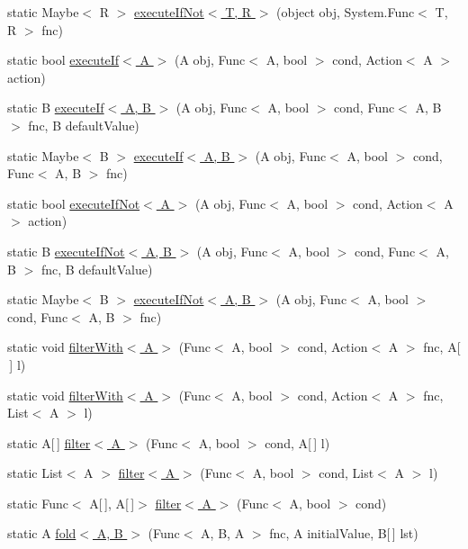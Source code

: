 \begin{DoxyCompactItemize}
\item 
static Maybe$<$ R $>$ \hyperlink{class_prelude_ace501339d5ef1cf13eb4746e6a0b27af}{execute\+If\+Not$<$ T, R $>$} (object obj, System.\+Func$<$ T, R $>$ fnc)
\item 
static bool \hyperlink{class_prelude_a38a60446bd79916c6227e5a0b077229d}{execute\+If$<$ A $>$} (A obj, Func$<$ A, bool $>$ cond, Action$<$ A $>$ action)
\item 
static B \hyperlink{class_prelude_a79b3e2cdfd4d9644e41eb4606995c38c}{execute\+If$<$ A, B $>$} (A obj, Func$<$ A, bool $>$ cond, Func$<$ A, B $>$ fnc, B default\+Value)
\item 
static Maybe$<$ B $>$ \hyperlink{class_prelude_a6731d46b0ab34f839a0b678f10d77767}{execute\+If$<$ A, B $>$} (A obj, Func$<$ A, bool $>$ cond, Func$<$ A, B $>$ fnc)
\item 
static bool \hyperlink{class_prelude_a0ebab45fe6b32e21f9c7583cecd0c09b}{execute\+If\+Not$<$ A $>$} (A obj, Func$<$ A, bool $>$ cond, Action$<$ A $>$ action)
\item 
static B \hyperlink{class_prelude_ac25dc41055df92de21bfa4cb6c628bf6}{execute\+If\+Not$<$ A, B $>$} (A obj, Func$<$ A, bool $>$ cond, Func$<$ A, B $>$ fnc, B default\+Value)
\item 
static Maybe$<$ B $>$ \hyperlink{class_prelude_ac486b5454a2b4a185a5f9014b611da7d}{execute\+If\+Not$<$ A, B $>$} (A obj, Func$<$ A, bool $>$ cond, Func$<$ A, B $>$ fnc)
\item 
static void \hyperlink{class_prelude_a6cc74bcaf8aed783b0d48568398975a6}{filter\+With$<$ A $>$} (Func$<$ A, bool $>$ cond, Action$<$ A $>$ fnc, A\mbox{[}$\,$\mbox{]} l)
\item 
static void \hyperlink{class_prelude_a90edafd760bdf8aa23550363c73abfb8}{filter\+With$<$ A $>$} (Func$<$ A, bool $>$ cond, Action$<$ A $>$ fnc, List$<$ A $>$ l)
\item 
static A\mbox{[}$\,$\mbox{]} \hyperlink{class_prelude_ad3b976f2cce4178034c114f62ee9cc58}{filter$<$ A $>$} (Func$<$ A, bool $>$ cond, A\mbox{[}$\,$\mbox{]} l)
\item 
static List$<$ A $>$ \hyperlink{class_prelude_a56f75061d1dab20e414f76a3d01f108b}{filter$<$ A $>$} (Func$<$ A, bool $>$ cond, List$<$ A $>$ l)
\item 
static Func$<$ A\mbox{[}$\,$\mbox{]}, A\mbox{[}$\,$\mbox{]}$>$ \hyperlink{class_prelude_a0f0ed36b33cef67cc9440f0bac9e612a}{filter$<$ A $>$} (Func$<$ A, bool $>$ cond)
\item 
static A \hyperlink{class_prelude_a14a63e3c4c2c78451ffe9199cda95747}{fold$<$ A, B $>$} (Func$<$ A, B, A $>$ fnc, A initial\+Value, B\mbox{[}$\,$\mbox{]} lst)

\end{DoxyCompactItemize}

